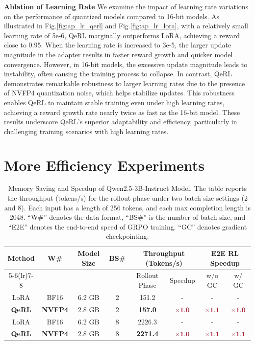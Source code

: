 \textbf{Ablation of Learning Rate} We examine the impact of learning rate variations on the performance of quantized models compared to 16-bit models. As illustrated in Fig.\ref{fig:ap_lr_qerl} and Fig.\ref{fig:ap_lr_lora}, with a relatively small learning rate of 5e-6, QeRL marginally outperforms LoRA, achieving a reward close to 0.95. When the learning rate is increased to 3e-5, the larger update magnitude in the adapter results in faster reward growth and quicker model convergence. However, in 16-bit models, the excessive update magnitude leads to instability, often causing the training process to collapse. In contrast, QeRL demonstrates remarkable robustness to larger learning rates due to the presence of NVFP4 quantization noise, which helps stabilize updates. This robustness enables QeRL to maintain stable training even under high learning rates, achieving a reward growth rate nearly twice as fast as the 16-bit model. These results underscore QeRL's superior adaptability and efficiency, particularly in challenging training scenarios with high learning rates.

\section{More Efficiency Experiments}\label{ap:efficient}

\begin{table}[t]
\centering
\begin{tabular}{cccccccc}
\toprule
\multirow{2}{*}{\textbf{Method}} & \multirow{2}{*}{\textbf{W\#}} & \multirow{2}{*}{\textbf{Model Size}} & \multirow{2}{*}{\textbf{BS\#}} & \multicolumn{2}{c}{\textbf{Throughput (Tokens/s)}} & \multicolumn{2}{c}{\textbf{E2E RL Speedup}} \\
\cmidrule(lr){5-6}\cmidrule(lr){7-8}
&&&& Rollout Phase & Speedup & w/o GC & w/ GC \\
\midrule
LoRA & BF16  & 6.2 GB & 2 & 151.2 & - & - & - \\
\textbf{QeRL} & \textbf{NVFP4} & 2.8 GB & 2 & \textbf{157.0} & $\textcolor{hanred}{\times\mathbf{1.0}}$ & $\textcolor{hanred}{\times\mathbf{1.1}}$ & $\textcolor{hanred}{\times\mathbf{1.0}}$ \\
\midrule \midrule
LoRA & BF16  & 6.2 GB & 8 & 2226.3 & - & - & - \\
\textbf{QeRL} & \textbf{NVFP4} & 2.8 GB & 8 & \textbf{2271.4} & $\textcolor{hanred}{\times\mathbf{1.0}}$ & $\textcolor{hanred}{\times\mathbf{1.1}}$ & $\textcolor{hanred}{\times\mathbf{1.1}}$ \\
\bottomrule
\end{tabular}
\caption{Memory Saving and Speedup of Qwen2.5-3B-Instruct Model. The table reports the throughput (tokens/s) for the rollout phase under two batch size settings (2 and 8). Each input has a length of 256 tokens, and each max completion length is 2048. ``W\#'' denotes the data format, ``BS\#'' is the number of batch size, and ``E2E'' denotes the end-to-end speed of GRPO training. ``GC'' denotes gradient checkpointing.}
\label{tab:efficiency_3b}
\end{table}


